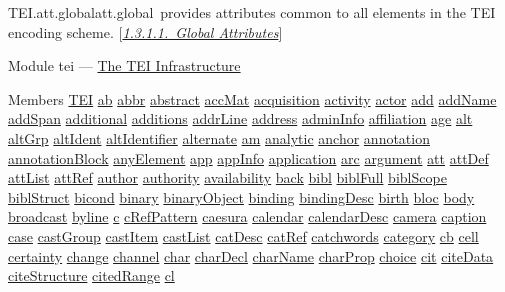 \begin{reflist}
\item[]\begin{specHead}{TEI.att.global}{att.global} provides attributes common to all elements in the TEI encoding scheme. [\textit{\hyperref[STGA]{1.3.1.1.\ Global Attributes}}]\end{specHead} 
    \item[{Module}]
  tei — \hyperref[ST]{The TEI Infrastructure}
    \item[{Members}]
  \hyperref[TEI.TEI]{TEI} \hyperref[TEI.ab]{ab} \hyperref[TEI.abbr]{abbr} \hyperref[TEI.abstract]{abstract} \hyperref[TEI.accMat]{accMat} \hyperref[TEI.acquisition]{acquisition} \hyperref[TEI.activity]{activity} \hyperref[TEI.actor]{actor} \hyperref[TEI.add]{add} \hyperref[TEI.addName]{addName} \hyperref[TEI.addSpan]{addSpan} \hyperref[TEI.additional]{additional} \hyperref[TEI.additions]{additions} \hyperref[TEI.addrLine]{addrLine} \hyperref[TEI.address]{address} \hyperref[TEI.adminInfo]{adminInfo} \hyperref[TEI.affiliation]{affiliation} \hyperref[TEI.age]{age} \hyperref[TEI.alt]{alt} \hyperref[TEI.altGrp]{altGrp} \hyperref[TEI.altIdent]{altIdent} \hyperref[TEI.altIdentifier]{altIdentifier} \hyperref[TEI.alternate]{alternate} \hyperref[TEI.am]{am} \hyperref[TEI.analytic]{analytic} \hyperref[TEI.anchor]{anchor} \hyperref[TEI.annotation]{annotation} \hyperref[TEI.annotationBlock]{annotationBlock} \hyperref[TEI.anyElement]{anyElement} \hyperref[TEI.app]{app} \hyperref[TEI.appInfo]{appInfo} \hyperref[TEI.application]{application} \hyperref[TEI.arc]{arc} \hyperref[TEI.argument]{argument} \hyperref[TEI.att]{att} \hyperref[TEI.attDef]{attDef} \hyperref[TEI.attList]{attList} \hyperref[TEI.attRef]{attRef} \hyperref[TEI.author]{author} \hyperref[TEI.authority]{authority} \hyperref[TEI.availability]{availability} \hyperref[TEI.back]{back} \hyperref[TEI.bibl]{bibl} \hyperref[TEI.biblFull]{biblFull} \hyperref[TEI.biblScope]{biblScope} \hyperref[TEI.biblStruct]{biblStruct} \hyperref[TEI.bicond]{bicond} \hyperref[TEI.binary]{binary} \hyperref[TEI.binaryObject]{binaryObject} \hyperref[TEI.binding]{binding} \hyperref[TEI.bindingDesc]{bindingDesc} \hyperref[TEI.birth]{birth} \hyperref[TEI.bloc]{bloc} \hyperref[TEI.body]{body} \hyperref[TEI.broadcast]{broadcast} \hyperref[TEI.byline]{byline} \hyperref[TEI.c]{c} \hyperref[TEI.cRefPattern]{cRefPattern} \hyperref[TEI.caesura]{caesura} \hyperref[TEI.calendar]{calendar} \hyperref[TEI.calendarDesc]{calendarDesc} \hyperref[TEI.camera]{camera} \hyperref[TEI.caption]{caption} \hyperref[TEI.case]{case} \hyperref[TEI.castGroup]{castGroup} \hyperref[TEI.castItem]{castItem} \hyperref[TEI.castList]{castList} \hyperref[TEI.catDesc]{catDesc} \hyperref[TEI.catRef]{catRef} \hyperref[TEI.catchwords]{catchwords} \hyperref[TEI.category]{category} \hyperref[TEI.cb]{cb} \hyperref[TEI.cell]{cell} \hyperref[TEI.certainty]{certainty} \hyperref[TEI.change]{change} \hyperref[TEI.channel]{channel} \hyperref[TEI.char]{char} \hyperref[TEI.charDecl]{charDecl} \hyperref[TEI.charName]{charName} \hyperref[TEI.charProp]{charProp} \hyperref[TEI.choice]{choice} \hyperref[TEI.cit]{cit} \hyperref[TEI.citeData]{citeData} \hyperref[TEI.citeStructure]{citeStructure} \hyperref[TEI.citedRange]{citedRange} \hyperref[TEI.cl]{cl} 
\end{reflist}
